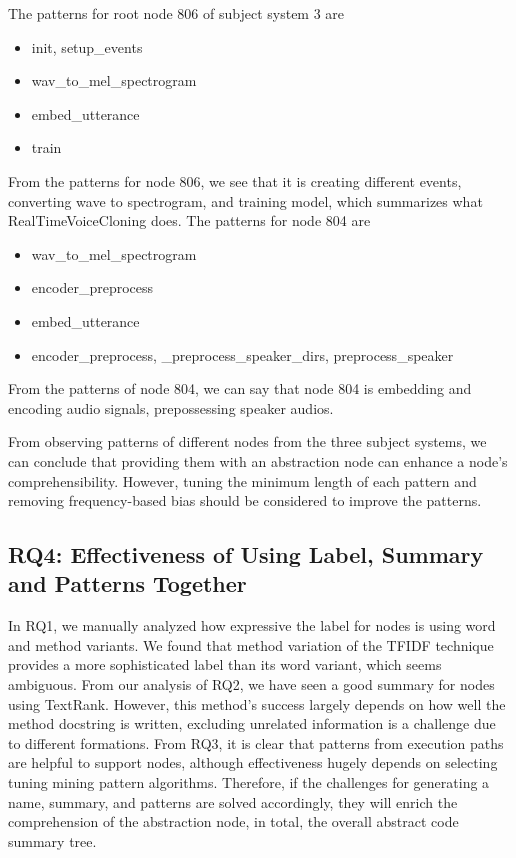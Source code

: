 The patterns for root node 806 of subject system 3 are

\begin{itemize}
    \item init, setup\_events
    \item wav\_to\_mel\_spectrogram
    \item embed\_utterance
    \item train
\end{itemize}

From the patterns for node 806, we see that it is creating different events, converting wave to spectrogram, and training model, which summarizes what Real\-Time\-Voice\-Cloning does. 
The patterns for node 804 are

\begin{itemize}
    \item wav\_to\_mel\_spectrogram
    \item encoder\_preprocess
    \item embed\_utterance
    \item encoder\_preprocess, \_preprocess\_speaker\_dirs,
    preprocess\_speaker
\end{itemize}
From the patterns of node 804, we can say that node 804 is embedding and encoding audio signals, prepossessing speaker audios.

From observing patterns of different nodes from the three subject systems, we can conclude that providing them with an abstraction node can enhance a node's comprehensibility. However, tuning the minimum length of each pattern and removing frequency-based bias should be considered to improve the patterns.


\subsection{ RQ4: Effectiveness of Using Label, Summary and Patterns Together}
In RQ1, we manually analyzed how expressive the label for nodes is using word and method variants. We found that method variation of the TFIDF technique provides a more sophisticated label than its word variant, which seems ambiguous. From our analysis of RQ2, we have seen a good summary for nodes using TextRank. However, this method's success largely depends on how well the method docstring is written, excluding unrelated information is a challenge due to different formations. From RQ3, it is clear that patterns from execution paths are helpful to support nodes, although effectiveness hugely depends on selecting tuning mining pattern algorithms. Therefore, if the challenges for generating a name, summary, and patterns are solved accordingly, they will enrich the comprehension of the abstraction node, in total, the overall abstract code summary tree. 

